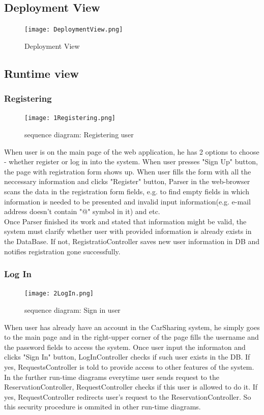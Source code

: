 \documentclass[12pt, letterpaper]{article}
\begin{document}
\subsection{Deployment View} 

\begin{figure}[H]
\centering
\texttt{[image: DeploymentView.png]} 
\caption{Deployment View}
\label{fig:DepView}
\end{figure}

\newpage
\subsection{Runtime view}


\subsubsection{Registering}
\begin{figure}[H]
\centering
\texttt{[image: 1Registering.png]} 
\caption{sequence diagram: Registering user}
\label{fig:1Registering}
\end{figure}
\newpage
When user is on the main page of the web application, he has 2 options to choose - whether register or log in into the system. When user presses "Sign Up" button, the page with registration form shows up. When user fills the form with all the neccessary information and clicks "Register" button, Parser in the web-browser scans the data in the registration form fields, e.g. to find empty fields in which information is needed to be presented and invalid input information(e.g. e-mail address doesn't contain "@" symbol in it) and etc. \\
Once Parser finished its work and stated that information might be valid, the system must clarify whether user with provided information is already exists in the DataBase. If not, RegistratioController saves new user information in DB and notifies registration gone successfully.   
\newpage

\subsubsection{Log In}
\begin{figure}[H]
\centering
\texttt{[image: 2LogIn.png]} 
\caption{sequence diagram: Sign in user}
\label{fig:2LogIn}
\end{figure}
\newpage
When user has already have an account in the CarSharing system, he simply goes to the main page and in the right-upper corner of the page fills the username and the password fields to access the system. Once user input the informaton and clicks "Sign In" button, LogInController checks if such user exists in the DB. If yes, RequestsController is told to provide access to other features of the system. In the further run-time diagrams everytime user sends request to the ReservationController, RequestController checks if this user is allowed to do it. If yes, RequestController redirects user's request to the ReservationController. So this security procedure is ommited in other run-time diagrams. 
\newpage
\end{document}

